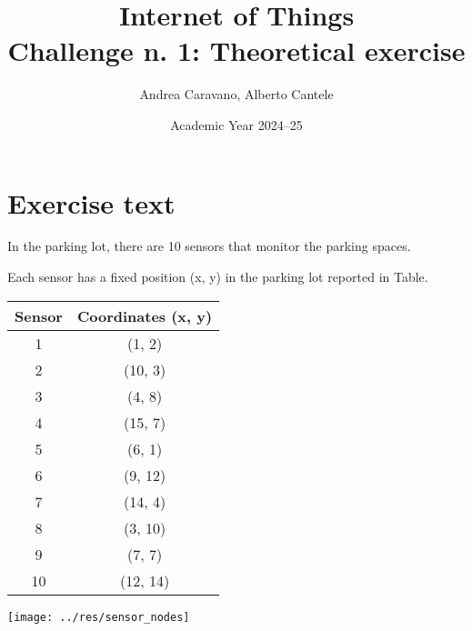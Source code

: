 \documentclass[a4paper,11pt]{article} %
\begin{document}
    \pagestyle{fancy}
    \fancyhead{}\fancyfoot{}
    \fancyfoot[C]{\thepage}

    \title{\textbf{Internet of Things}\\Challenge n. 1: Theoretical exercise}
    \author{Andrea Caravano, Alberto Cantele}
    \date{Academic Year 2024--25}
    \maketitle


    \section{Exercise text}\label{sec:exercise-text}
    In the parking lot, there are 10 sensors that monitor the parking spaces.

    Each sensor has a fixed position (x, y) in the parking lot reported in Table.

    \begin{center}
        \begin{tabular}{|c|c|}
            \hline
            Sensor & Coordinates (x, y) \\
            \hline
            1      & (1, 2)             \\
            \hline
            2      & (10, 3)            \\
            \hline
            3      & (4, 8)             \\
            \hline
            4      & (15, 7)            \\
            \hline
            5      & (6, 1)             \\
            \hline
            6      & (9, 12)            \\
            \hline
            7      & (14, 4)            \\
            \hline
            8      & (3, 10)            \\
            \hline
            9      & (7, 7)             \\
            \hline
            10     & (12, 14)           \\
            \hline
        \end{tabular}
    \end{center}

    \begin{center}
        \texttt{[image: ../res/sensor\_nodes]}
    \end{center}
\end{document}
